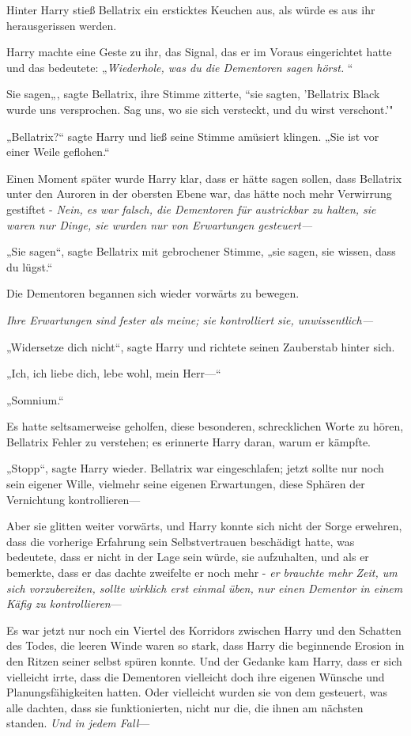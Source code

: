{Hinter Harry stieß Bellatrix ein ersticktes Keuchen aus, als würde es aus ihr herausgerissen werden.

Harry machte eine Geste zu ihr, das Signal, das er im Voraus eingerichtet hatte und das bedeutete: „\emph{Wiederhole, was du die Dementoren sagen hörst. }“

Sie sagen„, sagte Bellatrix, ihre Stimme zitterte, “sie sagten, 'Bellatrix Black wurde uns versprochen. Sag uns, wo sie sich versteckt, und du wirst verschont.'"

„Bellatrix?“ sagte Harry und ließ seine Stimme amüsiert klingen. „Sie ist vor einer Weile geflohen.“

Einen Moment später wurde Harry klar, dass er hätte sagen sollen, dass Bellatrix unter den Auroren in der obersten Ebene war, das hätte noch mehr Verwirrung gestiftet - \emph{Nein, es war falsch, die Dementoren für austrickbar zu halten, sie waren nur Dinge, sie wurden nur von Erwartungen gesteuert—}

„Sie sagen“, sagte Bellatrix mit gebrochener Stimme, „sie sagen, sie wissen, dass du lügst.“

Die Dementoren begannen sich wieder vorwärts zu bewegen.

\emph{Ihre Erwartungen sind fester als meine; sie kontrolliert sie, unwissentlich—}

„Widersetze dich nicht“, sagte Harry und richtete seinen Zauberstab hinter sich.

„Ich, ich liebe dich, lebe wohl, mein Herr—“

„Somnium.“

Es hatte seltsamerweise geholfen, diese besonderen, schrecklichen Worte zu hören, Bellatrix Fehler zu verstehen; es erinnerte Harry daran, warum er kämpfte.

„Stopp“, sagte Harry wieder. Bellatrix war eingeschlafen; jetzt sollte nur noch sein eigener Wille, vielmehr seine eigenen Erwartungen, diese Sphären der Vernichtung kontrollieren—

Aber sie glitten weiter vorwärts, und Harry konnte sich nicht der Sorge erwehren, dass die vorherige Erfahrung sein Selbstvertrauen beschädigt hatte, was bedeutete, dass er nicht in der Lage sein würde, sie aufzuhalten, und als er bemerkte, dass er das dachte zweifelte er noch mehr - \emph{er brauchte mehr Zeit, um sich vorzubereiten, sollte wirklich erst einmal üben, nur einen Dementor in einem Käfig zu kontrollieren}—

Es war jetzt nur noch ein Viertel des Korridors zwischen Harry und den Schatten des Todes, die leeren Winde waren so stark, dass Harry die beginnende Erosion in den Ritzen seiner selbst spüren konnte. Und der Gedanke kam Harry, dass er sich vielleicht irrte, dass die Dementoren vielleicht doch ihre eigenen Wünsche und Planungsfähigkeiten hatten. Oder vielleicht wurden sie von dem gesteuert, was alle dachten, dass sie funktionierten, nicht nur die, die ihnen am nächsten standen. \emph{Und in jedem Fall}—

}
